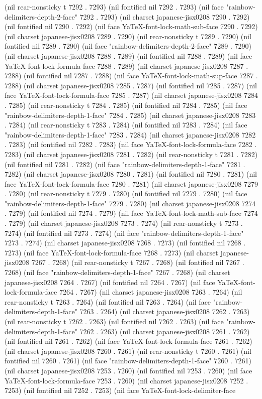 (nil rear-nonsticky t 7292 . 7293) (nil fontified nil 7292 . 7293) (nil face "rainbow-delimiters-depth-2-face" 7292 . 7293) (nil charset japanese-jisx0208 7290 . 7292) (nil fontified nil 7290 . 7292) (nil face YaTeX-font-lock-math-sub-face 7290 . 7292) (nil charset japanese-jisx0208 7289 . 7290) (nil rear-nonsticky t 7289 . 7290) (nil fontified nil 7289 . 7290) (nil face "rainbow-delimiters-depth-2-face" 7289 . 7290) (nil charset japanese-jisx0208 7288 . 7289) (nil fontified nil 7288 . 7289) (nil face YaTeX-font-lock-formula-face 7288 . 7289) (nil charset japanese-jisx0208 7287 . 7288) (nil fontified nil 7287 . 7288) (nil face YaTeX-font-lock-math-sup-face 7287 . 7288) (nil charset japanese-jisx0208 7285 . 7287) (nil fontified nil 7285 . 7287) (nil face YaTeX-font-lock-formula-face 7285 . 7287) (nil charset japanese-jisx0208 7284 . 7285) (nil rear-nonsticky t 7284 . 7285) (nil fontified nil 7284 . 7285) (nil face "rainbow-delimiters-depth-1-face" 7284 . 7285) (nil charset japanese-jisx0208 7283 . 7284) (nil rear-nonsticky t 7283 . 7284) (nil fontified nil 7283 . 7284) (nil face "rainbow-delimiters-depth-1-face" 7283 . 7284) (nil charset japanese-jisx0208 7282 . 7283) (nil fontified nil 7282 . 7283) (nil face YaTeX-font-lock-formula-face 7282 . 7283) (nil charset japanese-jisx0208 7281 . 7282) (nil rear-nonsticky t 7281 . 7282) (nil fontified nil 7281 . 7282) (nil face "rainbow-delimiters-depth-1-face" 7281 . 7282) (nil charset japanese-jisx0208 7280 . 7281) (nil fontified nil 7280 . 7281) (nil face YaTeX-font-lock-formula-face 7280 . 7281) (nil charset japanese-jisx0208 7279 . 7280) (nil rear-nonsticky t 7279 . 7280) (nil fontified nil 7279 . 7280) (nil face "rainbow-delimiters-depth-1-face" 7279 . 7280) (nil charset japanese-jisx0208 7274 . 7279) (nil fontified nil 7274 . 7279) (nil face YaTeX-font-lock-math-sub-face 7274 . 7279) (nil charset japanese-jisx0208 7273 . 7274) (nil rear-nonsticky t 7273 . 7274) (nil fontified nil 7273 . 7274) (nil face "rainbow-delimiters-depth-1-face" 7273 . 7274) (nil charset japanese-jisx0208 7268 . 7273) (nil fontified nil 7268 . 7273) (nil face YaTeX-font-lock-formula-face 7268 . 7273) (nil charset japanese-jisx0208 7267 . 7268) (nil rear-nonsticky t 7267 . 7268) (nil fontified nil 7267 . 7268) (nil face "rainbow-delimiters-depth-1-face" 7267 . 7268) (nil charset japanese-jisx0208 7264 . 7267) (nil fontified nil 7264 . 7267) (nil face YaTeX-font-lock-formula-face 7264 . 7267) (nil charset japanese-jisx0208 7263 . 7264) (nil rear-nonsticky t 7263 . 7264) (nil fontified nil 7263 . 7264) (nil face "rainbow-delimiters-depth-1-face" 7263 . 7264) (nil charset japanese-jisx0208 7262 . 7263) (nil rear-nonsticky t 7262 . 7263) (nil fontified nil 7262 . 7263) (nil face "rainbow-delimiters-depth-1-face" 7262 . 7263) (nil charset japanese-jisx0208 7261 . 7262) (nil fontified nil 7261 . 7262) (nil face YaTeX-font-lock-formula-face 7261 . 7262) (nil charset japanese-jisx0208 7260 . 7261) (nil rear-nonsticky t 7260 . 7261) (nil fontified nil 7260 . 7261) (nil face "rainbow-delimiters-depth-1-face" 7260 . 7261) (nil charset japanese-jisx0208 7253 . 7260) (nil fontified nil 7253 . 7260) (nil face YaTeX-font-lock-formula-face 7253 . 7260) (nil charset japanese-jisx0208 7252 . 7253) (nil fontified nil 7252 . 7253) (nil face YaTeX-font-lock-delimiter-face 